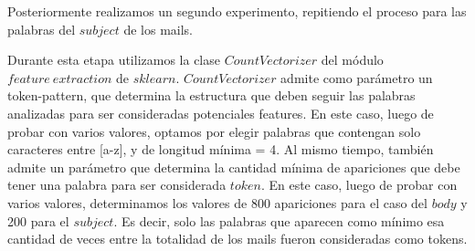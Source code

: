 Posteriormente realizamos un segundo experimento, repitiendo el proceso para las palabras del \(subject\) de los mails.

Durante esta etapa utilizamos la clase \(CountVectorizer\) del módulo \(feature \ extraction\) de \(sklearn\). \(CountVectorizer\) admite como parámetro un token-pattern,
que determina la estructura que deben seguir las palabras analizadas para ser consideradas potenciales features. En este caso, luego de probar con varios valores, optamos
por elegir palabras que contengan solo caracteres entre [a-z], y de longitud mínima = 4. Al mismo tiempo, también admite un parámetro que determina
la cantidad mínima de apariciones que debe tener una palabra para ser considerada \(token\). En este caso, luego de probar con varios valores, determinamos los valores de
800 apariciones para el caso del \(body\) y 200 para el \(subject\). Es decir, solo las palabras que aparecen como mínimo esa cantidad de veces entre la totalidad de
los mails fueron consideradas como tokens.
